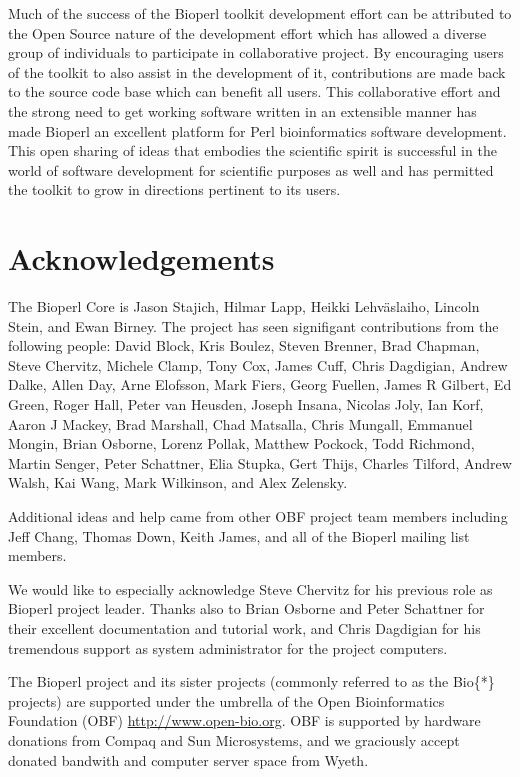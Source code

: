 \documentclass[12pt]{article}
\begin{document}
Much of the success of the Bioperl toolkit development effort can be
attributed to the Open Source nature of the development effort which
has allowed a diverse group of individuals to participate in
collaborative project.  By encouraging users of the toolkit to also
assist in the development of it, contributions are made back to the
source code base which can benefit all users.  This collaborative
effort and the strong need to get working software written in
an extensible manner has made Bioperl an excellent platform for Perl
bioinformatics software development.  This open sharing of ideas that
embodies the scientific spirit is successful in the world of software
development for scientific purposes as well and has permitted the
toolkit to grow in directions pertinent to its users.

\section{Acknowledgements}

The Bioperl Core is Jason Stajich, Hilmar Lapp, Heikki Lehv\"{a}slaiho,
Lincoln Stein, and Ewan Birney.  The project has seen signifigant
contributions from the following people: David Block, Kris Boulez,
Steven Brenner, Brad Chapman, Steve Chervitz, Michele Clamp, Tony Cox,
James Cuff, Chris Dagdigian, Andrew Dalke, Allen Day, Arne Elofsson,
Mark Fiers, Georg Fuellen, James R Gilbert, Ed Green, Roger Hall,
Peter van Heusden, Joseph Insana, Nicolas Joly, Ian Korf, Aaron J
Mackey, Brad Marshall, Chad Matsalla, Chris Mungall, Emmanuel Mongin,
Brian Osborne, Lorenz Pollak, Matthew Pockock, Todd Richmond, Martin
Senger, Peter Schattner, Elia Stupka, Gert Thijs, Charles Tilford,
Andrew Walsh, Kai Wang, Mark Wilkinson, and Alex Zelensky.

Additional ideas and help came from other OBF project team members
including Jeff Chang, Thomas Down, Keith James, and all of the Bioperl
mailing list members.

We would like to especially acknowledge Steve Chervitz for his
previous role as Bioperl project leader.  Thanks also to Brian Osborne
and Peter Schattner for their excellent documentation and tutorial
work, and Chris Dagdigian for his tremendous support as system
administrator for the project computers.

The Bioperl project and its sister projects (commonly referred to as
the Bio\{*\} projects) are supported under the umbrella of the Open
Bioinformatics Foundation (OBF) \url{http://www.open-bio.org}.
OBF is supported by hardware donations from Compaq and Sun
Microsystems, and we graciously accept donated bandwith and computer
server space from Wyeth.
\end{document}
